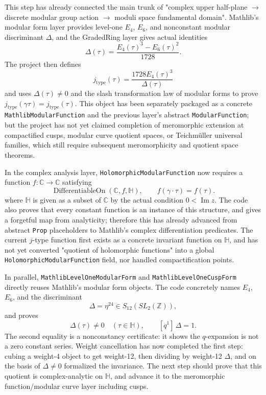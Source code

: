 \documentclass[UTF8,a4paper,11pt]{article}
\begin{document}
This step has already connected the main trunk of "complex upper half-plane \(\to\) discrete modular group action \(\to\) moduli space fundamental domain". Mathlib's modular form layer provides level-one $E_4$, $E_6$, and nonconstant modular discriminant $\Delta$, and the GradedRing layer gives actual identities
\[
  \Delta(\tau)=\frac{E_4(\tau)^3-E_6(\tau)^2}{1728}.
\]
The project then defines
\[
  j_{\mathrm{type}}(\tau)=\frac{1728E_4(\tau)^3}{\Delta(\tau)}
\]
and uses \(\Delta(\tau)\ne0\) and the slash transformation law of modular forms to prove
\(j_{\mathrm{type}}(\gamma\tau)=j_{\mathrm{type}}(\tau)\). This object has been separately packaged as a concrete
\texttt{MathlibModularFunction} and the previous layer's abstract \texttt{ModularFunction}; but the project has not yet claimed completion of meromorphic extension at compactified cusps, modular curve quotient spaces, or Teichmüller universal families, which still require subsequent meromorphicity and quotient space theorems.

In the complex analysis layer, \texttt{HolomorphicModularFunction} now requires a function
\(f:\mathbb C\to\mathbb C\) satisfying
\[
  \operatorname{DifferentiableOn}(\mathbb C,f,\mathbb H),
  \qquad f(\gamma\cdot\tau)=f(\tau).
\]
where \(\mathbb H\) is given as a subset of \(\mathbb C\) by the actual condition \(0<\operatorname{Im}z\). The code also proves that every constant function is an instance of this structure, and gives a forgetful map from analyticity; therefore this has already advanced from abstract \texttt{Prop} placeholders to Mathlib's complex differentiation predicates. The current $j$-type function first exists as a concrete invariant function on \(\mathbb H\), and has not yet converted "quotient of holomorphic functions" into a global \texttt{HolomorphicModularFunction} field, nor handled compactification points.

In parallel, \texttt{MathlibLevelOneModularForm} and
\texttt{MathlibLevelOneCuspForm} directly reuses Mathlib's modular form objects. The code concretely names
\(E_4\), \(E_6\), and the discriminant
\[
  \Delta=\eta^{24}\in S_{12}(SL_2(\mathbb Z)),
\]
and proves
\[
  \Delta(\tau)\ne0\quad(\tau\in\mathbb H),\qquad
  [q^1]\,\Delta=1.
\]
The second equality is a nonconstancy certificate: it shows the $q$-expansion is not a zero constant series. Weight cancellation has now completed the first step: cubing a weight-4 object to get weight-12, then dividing by weight-12 $\Delta$, and on the basis of $\Delta\ne0$ formalized the invariance. The next step should prove that this quotient is complex-analytic on \(\mathbb H\), and advance it to the meromorphic function/modular curve layer including cusps.
\end{document}
